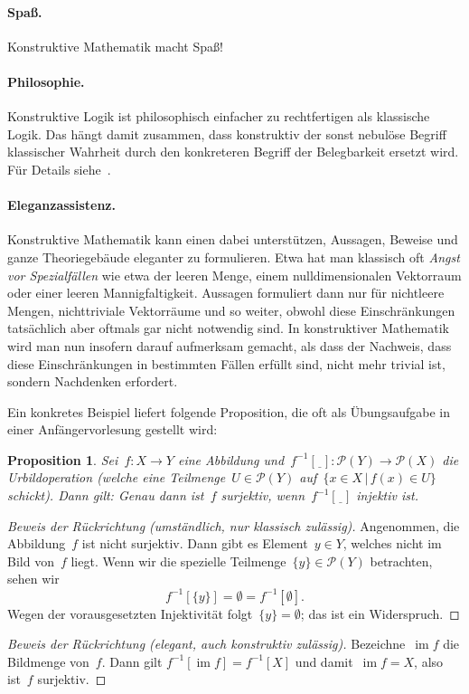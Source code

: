 \documentclass[a4paper,ngerman,12pt]{scrartcl}
\theoremstyle{definition}
\theoremstyle{plain}
\newtheorem{prop}[defn]{Proposition}
\theoremstyle{remark}
\renewcommand{\P}{\mathcal{P}}
\newcommand{\freist}{\underline{\ \ }}
\DeclareMathOperator{\im}{im}
\renewcommand{\_}{\mathpunct{.}\,}
\newcommand{\?}{\,{:}\,}
\begin{document}
\paragraph{Spaß.} Konstruktive Mathematik macht Spaß!

\paragraph{Philosophie.}
Konstruktive Logik ist philosophisch einfacher zu rechtfertigen als
klassische Logik. Das hängt damit zusammen, dass konstruktiv der sonst nebulöse
Begriff klassischer Wahrheit durch den konkreteren Begriff der Belegbarkeit
ersetzt wird. Für Details siehe~\cite{dummett:basis}.

\paragraph{Eleganzassistenz.}
Konstruktive Mathematik kann einen dabei unterstützen, Aussagen, Beweise und
ganze Theoriegebäude eleganter zu formulieren. Etwa hat man klassisch oft
\emph{Angst vor Spezialfällen} wie etwa der leeren Menge, einem
nulldimensionalen Vektorraum oder einer leeren Mannigfaltigkeit. Aussagen
formuliert dann nur für nichtleere Mengen, nichttriviale Vektorräume und so
weiter, obwohl diese Einschränkungen tatsächlich aber oftmals gar nicht
notwendig sind. In konstruktiver Mathematik wird man nun insofern darauf
aufmerksam gemacht, als dass der Nachweis, dass diese Einschränkungen in
bestimmten Fällen erfüllt sind, nicht mehr trivial ist, sondern Nachdenken
erfordert.

Ein konkretes Beispiel liefert folgende Proposition, die oft als Übungsaufgabe in
einer Anfängervorlesung gestellt wird:
\begin{prop}Sei~$f : X \to Y$ eine Abbildung und~$f^{-1}[\freist] : \P(Y) \to
\P(X)$ die Urbildoperation (welche eine Teilmenge~$U \in \P(Y)$ auf~$\{ x \in X
\,|\, f(x) \in U \}$ schickt). Dann gilt: Genau dann ist~$f$ surjektiv,
wenn~$f^{-1}[\freist]$ injektiv ist.
\end{prop}
\begin{proof}[Beweis der Rückrichtung (umständlich, nur klassisch zulässig)]
Angenommen, die Abbildung~$f$ ist nicht surjektiv. Dann gibt es Element~$y \in
Y$, welches nicht im Bild von~$f$ liegt. Wenn wir die spezielle
Teilmenge~$\{y\} \in \P(Y)$ betrachten, sehen wir
\[ f^{-1}[\{y\}] = \emptyset = f^{-1}[\emptyset]. \]
Wegen der vorausgesetzten Injektivität folgt~$\{y\} = \emptyset$; das ist ein
Widerspruch.\end{proof}
\begin{proof}[Beweis der Rückrichtung (elegant, auch konstruktiv zulässig)]
Bezeichne~$\im f$ die Bildmenge von~$f$. Dann gilt
$f^{-1}[\im f] = f^{-1}[X]$
und damit~$\im f = X$, also ist~$f$ surjektiv.\end{proof}
\end{document}

